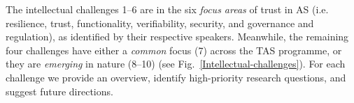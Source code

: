 \documentclass[sigconf,nonacm]{acmart}%
\begin{document}
The intellectual challenges 1--6 are in the six \emph{focus areas} of trust in AS (i.e. resilience, trust, functionality, verifiability, security, and governance and regulation), as identified by their respective speakers.
Meanwhile, the remaining four challenges have either a \emph{common} focus (7) across the TAS programme, or they are \emph{emerging} in nature (8--10) (see Fig.~\ref{Intellectual-challenges}). 
For each challenge we provide an overview, identify high-priority research questions, and suggest future directions.
%
%
%
%

\end{document}
